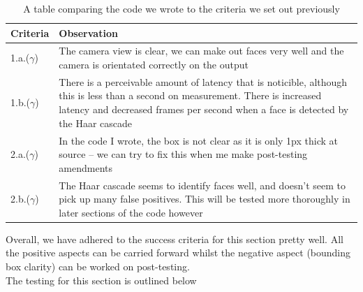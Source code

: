 \documentclass[9pt]{article}
\begin{document}
\begin{table}[H]
	\centering
	\begin{tabularx}{\textwidth}{lX}
		\textbf{Criteria} & \textbf{Observation}                                                                                                                                                                                                   \\ \midrule
		1.a.($ \gamma $)  & The camera view is clear, we can make out faces very well and the camera is orientated correctly on the output                                                                                                         \\
		1.b.($ \gamma $)  & There is a perceivable amount of latency that is noticible, although this is less than a second on measurement. There is increased latency and decreased frames per second when a face is detected by the Haar cascade \\
		2.a.($ \gamma $)  & In the code I wrote, the box is not clear as it is only 1px thick at source -- we can try to fix this when me make post-testing amendments                                                                             \\
		2.b.($ \gamma $)  & The Haar cascade seems to identify faces well, and doesn't seem to pick up many false positives. This will be tested more thoroughly in later sections of the code however \\ \bottomrule
	\end{tabularx}
	\caption{A table comparing the code we wrote to the criteria we set out previously}
	\label{tab_successCameraTest}
\end{table}
Overall, we have adhered to the success criteria for this section pretty well. All the positive aspects can be carried forward whilst the negative aspect (bounding box clarity) can be worked on post-testing.\\
The testing for this section is outlined below
\end{document}

